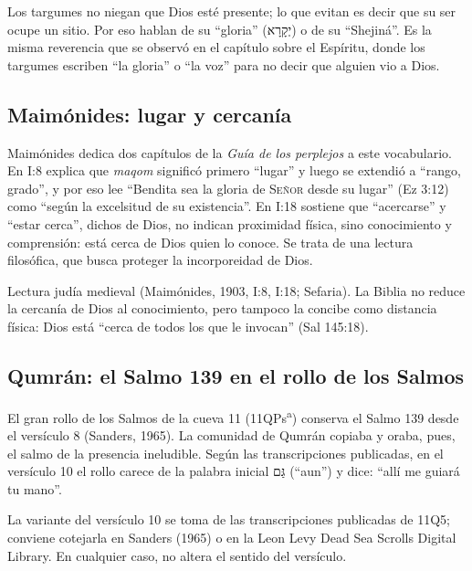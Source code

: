\documentclass[11pt,letterpaper]{article}
\newcommand{\heb}[1]{\mbox{\foreignlanguage{hebrew}{#1}}}
\newcommand{\SENOR}{\textsc{Señor}}
\begin{document}
Los targumes no niegan que Dios esté presente; lo que evitan es decir que su ser ocupe un sitio. Por eso hablan de su ``gloria'' (\heb{יְקָרָא}) o de su ``Shejiná''. Es la misma reverencia que se observó en el capítulo sobre el Espíritu, donde los targumes escriben ``la gloria'' o ``la voz'' para no decir que alguien vio a Dios.

\subsection{Maimónides: lugar y cercanía}

Maimónides dedica dos capítulos de la \emph{Guía de los perplejos} a este vocabulario. En I:8 explica que \emph{maqom} significó primero ``lugar'' y luego se extendió a ``rango, grado'', y por eso lee ``Bendita sea la gloria de \SENOR{} desde su lugar'' (Ez 3:12) como ``según la excelsitud de su existencia''. En I:18 sostiene que ``acercarse'' y ``estar cerca'', dichos de Dios, no indican proximidad física, sino conocimiento y comprensión: está cerca de Dios quien lo conoce. Se trata de una lectura filosófica, que busca proteger la incorporeidad de Dios.

\begin{nota}[Precisión]
Lectura judía medieval (Maimónides, 1903, I:8, I:18; Sefaria). La Biblia no reduce la cercanía de Dios al conocimiento, pero tampoco la concibe como distancia física: Dios está ``cerca de todos los que le invocan'' (Sal 145:18).
\end{nota}

\subsection{Qumrán: el Salmo 139 en el rollo de los Salmos}

El gran rollo de los Salmos de la cueva 11 (11QPs\textsuperscript{a}) conserva el Salmo 139 desde el versículo 8 (Sanders, 1965). La comunidad de Qumrán copiaba y oraba, pues, el salmo de la presencia ineludible. Según las transcripciones publicadas, en el versículo 10 el rollo carece de la palabra inicial \heb{גַּם} (``aun'') y dice: ``allí me guiará tu mano''.

\begin{nota}
La variante del versículo 10 se toma de las transcripciones publicadas de 11Q5; conviene cotejarla en Sanders (1965) o en la Leon Levy Dead Sea Scrolls Digital Library. En cualquier caso, no altera el sentido del versículo.
\end{nota}
\end{document}
